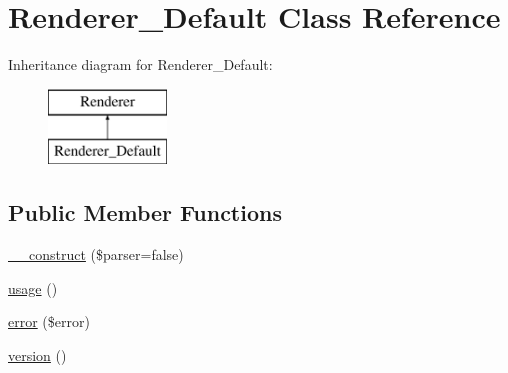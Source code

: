 \hypertarget{class_p_e_a_r2_1_1_console_1_1_command_line_1_1_renderer___default}{
\section{\-Renderer\-\_\-\-Default \-Class \-Reference}
\label{class_p_e_a_r2_1_1_console_1_1_command_line_1_1_renderer___default}
}
\-Inheritance diagram for \-Renderer\-\_\-\-Default\-:\begin{figure}[H]
\begin{center}
\leavevmode
\includegraphics[height=2.000000cm]{class_p_e_a_r2_1_1_console_1_1_command_line_1_1_renderer___default}
\end{center}
\end{figure}
\subsection*{\-Public \-Member \-Functions}
\begin{DoxyCompactItemize}
\item 
\hyperlink{class_p_e_a_r2_1_1_console_1_1_command_line_1_1_renderer___default_aa7850edce08c23778ec8f9ce1eb972f1}{\-\_\-\-\_\-construct} (\$parser=false)
\item 
\hyperlink{class_p_e_a_r2_1_1_console_1_1_command_line_1_1_renderer___default_afe55eae96aed06d16232a3b56fcf1ad3}{usage} ()
\item 
\hyperlink{class_p_e_a_r2_1_1_console_1_1_command_line_1_1_renderer___default_a02345776b3d51e94d7639121e23a2fad}{error} (\$error)
\item 
\hyperlink{class_p_e_a_r2_1_1_console_1_1_command_line_1_1_renderer___default_a6080dae0886626b9a4cedb29240708b1}{version} ()
\end{DoxyCompactItemize}
